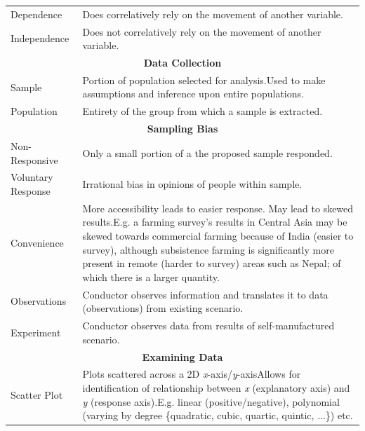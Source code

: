 \documentclass[11pt, english]{article}
\begin{document}
\begin{center}
\begin{longtable}{p{3cm}p{9cm}}
                Dependence & Does correlatively rely on the movement of another variable.\\
                Independence & Does not correlatively rely on the movement of another variable.\\
                \hline
                \hline
                \multicolumn{2}{c}{\textbf{Data Collection}}\\
                \hline
                \hline
                Sample & Portion of population selected for analysis.\newline Used to make assumptions and inference upon entire populations.\\
                Population & Entirety of the group from which a sample is extracted.\\
                \hline
                \multicolumn{2}{c}{\textbf{Sampling Bias}}\\
                \hline
		Non-Responsive & Only a small portion of a the proposed sample responded.\\
                Voluntary Response & Irrational bias in opinions of people within sample.\\
                Convenience & More accessibility leads to easier response. May lead to skewed results.\newline E.g. a farming survey’s results in Central Asia may be skewed towards commercial farming because of India (easier to survey), although subsistence farming is significantly more present in remote (harder to survey) areas such as Nepal; of which there is a larger quantity.\\
                Observations & Conductor observes information and translates it to data (observations) from existing scenario.\\
                Experiment & Conductor observes data from results of self-manufactured scenario.\\
                \hline
                \hline
                \multicolumn{2}{c}{\textbf{Examining Data}}\\
                \hline
                \hline
                Scatter Plot & Plots scattered across a 2D \textit{x}-axis/\textit{y}-axis\newline Allows for identification of relationship between \textit{x} (explanatory axis) and \textit{y} (response axis).\newline E.g. linear (positive/negative), polynomial (varying by degree \{quadratic, cubic, quartic, quintic, ...\}) etc.\\

\end{longtable}
\end{center}
\end{document}
